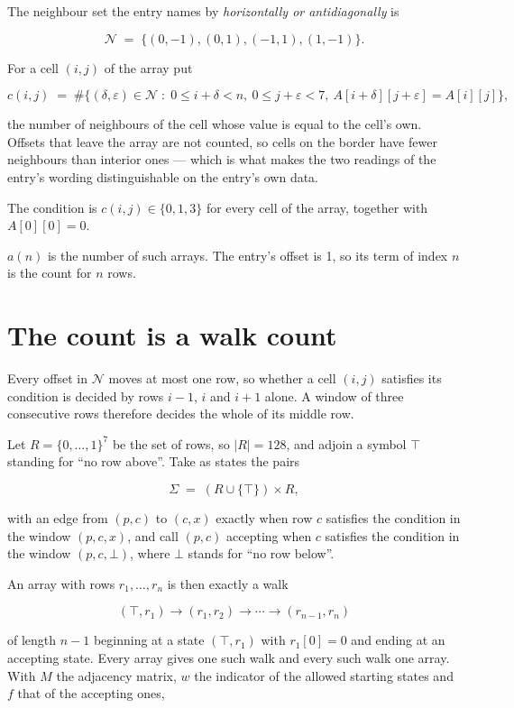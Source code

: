\documentclass[11pt]{article}
\theoremstyle{definition}
\begin{document}
The neighbour set the entry names by {\itshape horizontally or antidiagonally} is

\[\mathcal{N} \;=\; \{(0,-1), (0,1), (-1,1), (1,-1)\}.\]

For a cell $(i,j)$ of the array put

\[c(i,j) \;=\; \#\bigl\{(\delta,\varepsilon)\in\mathcal{N} \;:\; 0\le i+\delta<n,\ 0\le j+\varepsilon<7,\ A[i+\delta][j+\varepsilon] = A[i][j]\bigr\},\]

the number of neighbours of the cell whose value is equal to the cell's own. Offsets that leave the array are not counted, so cells on the border have fewer neighbours than interior ones --- which is what makes the two readings of the entry's wording distinguishable on the entry's own data.

The condition is $c(i,j) \in \{0, 1, 3\}$ for every cell of the array, together with $A[0][0]=0$.

$a(n)$ is the number of such arrays. The entry's offset is 1, so its term of index $n$ is the count for $n$ rows.

\section{The count is a walk count}

Every offset in $\mathcal{N}$ moves at most one row, so whether a cell $(i,j)$ satisfies its condition is decided by rows $i-1$, $i$ and $i+1$ alone. A window of three consecutive rows therefore decides the whole of its middle row.

Let $R = \{0,\dots,1\}^{7}$ be the set of rows, so $|R| = 128$, and adjoin a symbol $\top$ standing for ``no row above''. Take as states the pairs

\[\Sigma \;=\; (R \cup \{\top\}) \times R,\]

with an edge from $(p,c)$ to $(c,x)$ exactly when row $c$ satisfies the condition in the window $(p,c,x)$, and call $(p,c)$ accepting when $c$ satisfies the condition in the window $(p,c,\bot)$, where $\bot$ stands for ``no row below''.

An array with rows $r_1,\dots,r_n$ is then exactly a walk

\[(\top,r_1) \to (r_1,r_2) \to \cdots \to (r_{n-1},r_n)\]

of length $n-1$ beginning at a state $(\top,r_1)$ with $r_1[0]=0$ and ending at an accepting state. Every array gives one such walk and every such walk one array. With $M$ the adjacency matrix, $w$ the indicator of the allowed starting states and $f$ that of the accepting ones,
\end{document}
